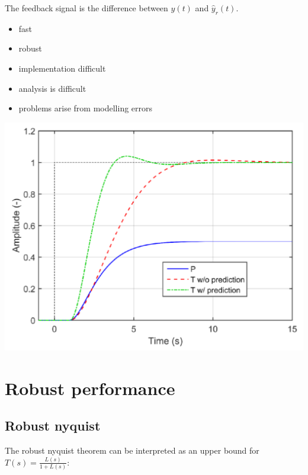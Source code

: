 \documentclass[10pt,a4paper]{scrartcl}
\begin{document}
\begin{multicols*}{3}
	The feedback signal is the difference between $y(t)$ and $\hat{y}_r(t)$.
	
	\finn	
	
	\begin{minipage}{0.5\linewidth}
	\small
	\begin{itemize}
	\compaq
	\item
	fast
	\item
	robust
	\item
	implementation difficult
	\item
	analysis is difficult
	\item
	problems arise from modelling errors
	\end{itemize}
	\normalsize
	\end{minipage}
	\hfill
	\begin{minipage}{0.4\linewidth}
	\includegraphics[angle=90,origin=c,width=\textwidth]{SmithResults}
	\end{minipage}
	
	
	
	\section{Robust performance}
	
	\subsection*{Robust nyquist}
	
	The robust nyquist theorem can be interpreted as an upper bound for $T(s)=\frac{L(s)}{1+L(s)}$:
	

\end{multicols*}
\end{document}

